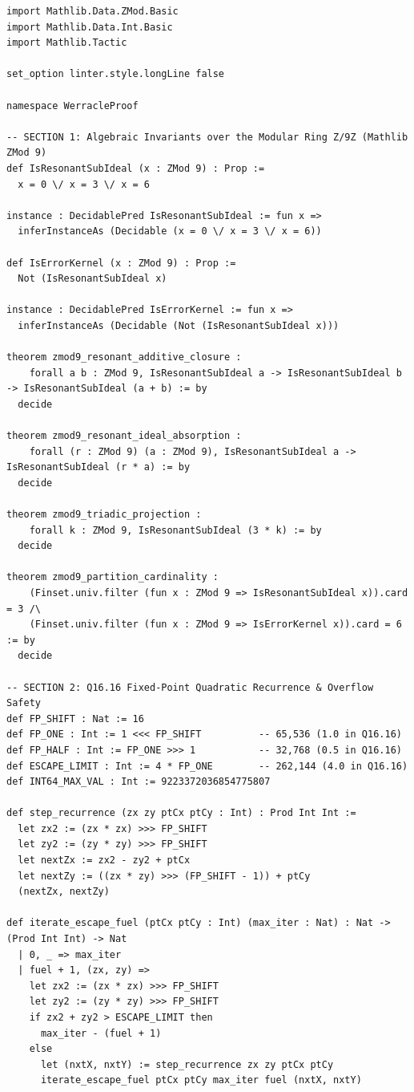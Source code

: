 \documentclass[10pt,a4paper]{article}
\begin{document}
\begin{lstlisting}[language=Lean4,caption={Complete verified Lean 4 proof module (\texttt{WerracleProof.lean}, compiled under Lean \texttt{v4.34.1} + Mathlib4, 0 \texttt{sorry}).}]
import Mathlib.Data.ZMod.Basic
import Mathlib.Data.Int.Basic
import Mathlib.Tactic

set_option linter.style.longLine false

namespace WerracleProof

-- SECTION 1: Algebraic Invariants over the Modular Ring Z/9Z (Mathlib ZMod 9)
def IsResonantSubIdeal (x : ZMod 9) : Prop :=
  x = 0 \/ x = 3 \/ x = 6

instance : DecidablePred IsResonantSubIdeal := fun x =>
  inferInstanceAs (Decidable (x = 0 \/ x = 3 \/ x = 6))

def IsErrorKernel (x : ZMod 9) : Prop :=
  Not (IsResonantSubIdeal x)

instance : DecidablePred IsErrorKernel := fun x =>
  inferInstanceAs (Decidable (Not (IsResonantSubIdeal x)))

theorem zmod9_resonant_additive_closure :
    forall a b : ZMod 9, IsResonantSubIdeal a -> IsResonantSubIdeal b -> IsResonantSubIdeal (a + b) := by
  decide

theorem zmod9_resonant_ideal_absorption :
    forall (r : ZMod 9) (a : ZMod 9), IsResonantSubIdeal a -> IsResonantSubIdeal (r * a) := by
  decide

theorem zmod9_triadic_projection :
    forall k : ZMod 9, IsResonantSubIdeal (3 * k) := by
  decide

theorem zmod9_partition_cardinality :
    (Finset.univ.filter (fun x : ZMod 9 => IsResonantSubIdeal x)).card = 3 /\
    (Finset.univ.filter (fun x : ZMod 9 => IsErrorKernel x)).card = 6 := by
  decide

-- SECTION 2: Q16.16 Fixed-Point Quadratic Recurrence & Overflow Safety
def FP_SHIFT : Nat := 16
def FP_ONE : Int := 1 <<< FP_SHIFT          -- 65,536 (1.0 in Q16.16)
def FP_HALF : Int := FP_ONE >>> 1           -- 32,768 (0.5 in Q16.16)
def ESCAPE_LIMIT : Int := 4 * FP_ONE        -- 262,144 (4.0 in Q16.16)
def INT64_MAX_VAL : Int := 9223372036854775807

def step_recurrence (zx zy ptCx ptCy : Int) : Prod Int Int :=
  let zx2 := (zx * zx) >>> FP_SHIFT
  let zy2 := (zy * zy) >>> FP_SHIFT
  let nextZx := zx2 - zy2 + ptCx
  let nextZy := ((zx * zy) >>> (FP_SHIFT - 1)) + ptCy
  (nextZx, nextZy)

def iterate_escape_fuel (ptCx ptCy : Int) (max_iter : Nat) : Nat -> (Prod Int Int) -> Nat
  | 0, _ => max_iter
  | fuel + 1, (zx, zy) =>
    let zx2 := (zx * zx) >>> FP_SHIFT
    let zy2 := (zy * zy) >>> FP_SHIFT
    if zx2 + zy2 > ESCAPE_LIMIT then
      max_iter - (fuel + 1)
    else
      let (nxtX, nxtY) := step_recurrence zx zy ptCx ptCy
      iterate_escape_fuel ptCx ptCy max_iter fuel (nxtX, nxtY)


\end{lstlisting}
\end{document}
